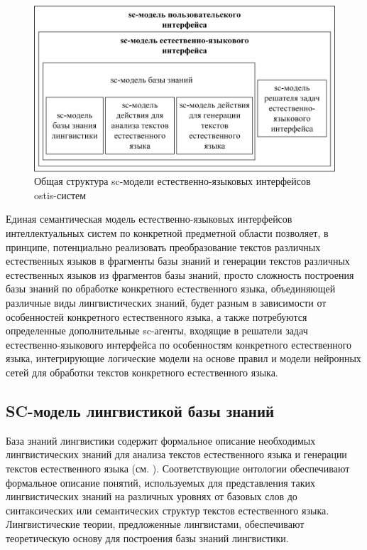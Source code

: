 \begin{figure}[H]
	\includegraphics[scale=0.8,width=1.0\textwidth]{images/part4/chapter_chinese/structure_interface.png}
	\caption{Общая структура sc-модели естественно-языковых интерфейсов ostis-систем}
	\label{fig:structure-sc-model-natural-interface}
\end{figure}

Единая семантическая модель естественно-языковых интерфейсов интеллектуальных систем по конкретной предметной области позволяет, в принципе, потенциально реализовать преобразование текстов различных естественных языков в фрагменты базы знаний и генерации текстов различных естественных языков из фрагментов базы знаний, просто сложность построения базы знаний по обработке конкретного естественного языка, объединяющей различные виды лингвистических знаний, будет разным в зависимости от особенностей конкретного естественного языка, а также потребуются определенные дополнительные sc-агенты, входящие в решатели задач естественно-языкового интерфейса по особенностям конкретного естественного языка, интегрирующие логические модели на основе правил и модели нейронных сетей для обработки текстов конкретного естественного языка.

\subsection{SC-модель лингвистикой базы знаний}
База знаний лингвистики содержит формальное описание необходимых лингвистических знаний для анализа текстов естественного языка и генерации текстов естественного языка (см. ). Соответствующие онтологии обеспечивают формальное описание понятий, используемых для представления таких лингвистических знаний на различных уровнях от базовых слов до синтаксических или семантических структур текстов естественного языка. Лингвистические теории, предложенные лингвистами, обеспечивают теоретическую основу для построения базы знаний лингвистики. 

